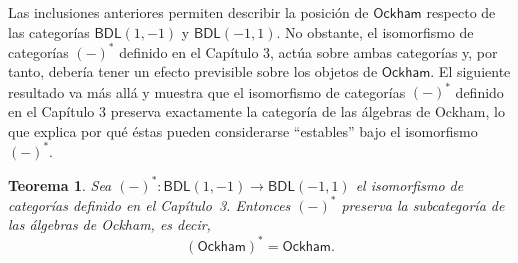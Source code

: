 \documentclass[12pt]{book}
\newtheorem{theorem}{Teorema}[section]
\newcommand{\BDL}{\mathsf{BDL}}
\newcommand{\Ock}{\mathsf{Ockham}}
\begin{document}
Las inclusiones anteriores permiten describir la posición de $\Ock$ respecto de las categorías $\BDL(1,-1)$ y $\BDL(-1,1)$.
No obstante, el isomorfismo de categorías $(-)^*$ definido en el Capítulo 3, actúa sobre ambas categorías y, por tanto, debería tener un efecto previsible sobre los objetos de $\Ock$.
El siguiente resultado va más allá y muestra que el isomorfismo de categorías $(-)^*$ definido en el Capítulo 3 preserva exactamente la categoría de las álgebras de Ockham, lo que explica por qué éstas pueden considerarse “estables” bajo el isomorfismo $(-)^*$.


\begin{theorem}\label{thm:Ock-intermedia-formal}
Sea $(-)^*\colon \BDL(1,-1)\to\BDL(-1,1)$ el isomorfismo de categorías definido en el Capítulo~3.
Entonces $(-)^*$ preserva la subcategoría de las álgebras de Ockham, es decir,
\[
(\Ock)^*=\Ock.
\]
\end{theorem}
\end{document}
